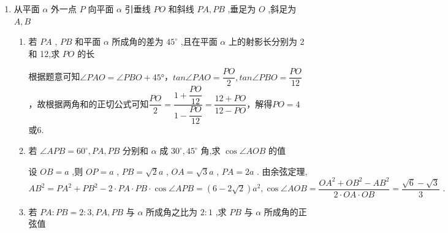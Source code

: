 \begin{enumerate}
\begin{enumerate}
\begin{jieda}
            \ps 先找到 ${AB}$ 在平面 ${BCD}$ 上的射影,此时再确定 ${AB}$ 上一点 $M$ 在该平面上的射影就相对容易了.
        \end{jieda}
        \item 从点 $P$ 出发的三条射线 ${PA},{PB},{PC}$ 两两都成 ${60}^{ \circ  }$ 角,求 ${PC}$ 与面 ${PAB}$ 所成角的余弦值
        \begin{jieda}
            在射线 ${PA}$ , ${PB}$ , ${PC}$ 上取 ${A}^{\prime }$ , ${B}^{\prime }$ , ${C}^{\prime }$ ,使 $P{A}^{\prime } = P{B}^{\prime } = P{C}^{\prime } = a$ ,可得正四面体 $P{A}^{\prime }{B}^{\prime }{C}^{\prime }$ ,问题转化为求棱 $P{C}^{\prime }$ 与底面 $P{A}^{\prime }{B}^{\prime }$ 所成角的余弦. ${C}^{\prime }$ 在 $P{A}^{\prime }{B}^{\prime }$ 上的射影是 $\bigtriangleup P{A}^{\prime }{B}^{\prime }$ 的中心,记为 $O$ ,则 $\cos \angle {C}^{\prime }{PO} = \dfrac{PO}{P{C}^{\prime }} = \dfrac{\dfrac{2}{3} \cdot  \dfrac{\sqrt{3}}{2}a}{a}$  $= \dfrac{\sqrt{3}}{3}$ .
        \end{jieda}
    \end{enumerate}
    \item 从平面 $\alpha$ 外一点 $P$ 向平面 $\alpha$ 引垂线 ${PO}$ 和斜线 ${PA},{PB}$ ,垂足为 $O$ ,斜足为 $A,B$ 
    \begin{enumerate}
        \item 若 ${PA}$ , ${PB}$ 和平面 $\alpha$ 所成角的差为 ${45}^{ \circ  }$ ,且在平面 $\alpha$ 上的射影长分别为 2 和 12,求 ${PO}$ 的长
        \begin{jieda}
            根据题意可知$\angle{PAO} = \angle{PBO} + \ang{45}$，$tan\angle{PAO} = \dfrac{PO}{2}, tan\angle{PBO} = \dfrac{PO}{12}$，故根据两角和的正切公式可知$\dfrac{PO}{2} = \dfrac{1+\dfrac{PO}{12}}{1-\dfrac{PO}{12}} = \dfrac{12+PO}{12-PO}$，解得$PO = 4$或$6$.
        \end{jieda}
        \item 若 $\angle {APB} = {60}^{ \circ  },{PA},{PB}$ 分别和 $\alpha$ 成 ${30}^{ \circ  },{45}^{ \circ  }$ 角,求 $\cos \angle {AOB}$ 的值
        \begin{jieda}
            设 ${OB} = a$ ,则 ${OP} = a$ , ${PB} = \sqrt{2}a$ , ${OA} = \sqrt{3}a$ , ${PA} = {2a}$ . 由余弦定理, $A{B}^{2} = P{A}^{2} + P{B}^{2} - 2 \cdot  {PA} \cdot  {PB} \cdot  \cos \angle {APB} = \left( {6 - 2\sqrt{2}}\right) {a}^{2},\cos \angle {AOB} = \dfrac{O{A}^{2} + O{B}^{2} - A{B}^{2}}{2 \cdot  {OA} \cdot  {OB}} = \dfrac{\sqrt{6} - \sqrt{3}}{3}\text{ . }$
        \end{jieda}
        \item 若 ${PA} : {PB} = 2 : 3,{PA},{PB}$ 与 $\alpha$ 所成角之比为 $2 : 1$ ,求 ${PB}$ 与 $\alpha$ 所成角的正弦值

\end{enumerate}
\end{enumerate}
